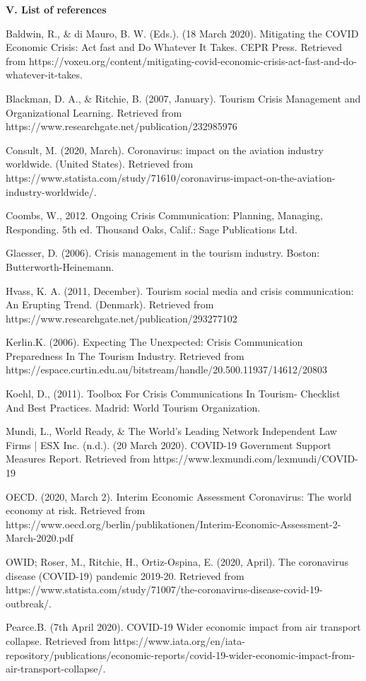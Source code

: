 \textbf{V. List of references}
\begin{flushleft}
Baldwin, R., \& di Mauro, B. W. (Eds.). (18 March 2020). Mitigating the COVID Economic Crisis: Act fast and Do Whatever It Takes. CEPR Press. Retrieved from https://voxeu.org/content/mitigating-covid-economic-crisis-act-fast-and-do-whatever-it-takes.

Blackman, D. A., \& Ritchie, B. (2007, January). Tourism Crisis Management and Organizational Learning. Retrieved from https://www.researchgate.net/publication/232985976

Consult, M. (2020, March). Coronavirus: impact on the aviation industry worldwide. (United States). Retrieved from https://www.statista.com/study/71610/coronavirus-impact-on-the-aviation-industry-worldwide/.

Coombs, W., 2012. Ongoing Crisis Communication: Planning, Managing, Responding. 5th ed. Thousand Oaks, Calif.: Sage Publications Ltd.

Glaesser, D. (2006). Crisis management in the tourism industry. Boston: Butterworth-Heinemann.

Hvass, K. A. (2011, December). Tourism social media and crisis communication: An Erupting Trend. (Denmark). Retrieved from https://www.researchgate.net/publication/293277102

Kerlin.K. (2006). Expecting The Unexpected: Crisis Communication Preparedness In The Tourism Industry. Retrieved from https://espace.curtin.edu.au/bitstream/handle/20.500.11937/14612/20803

Koehl, D., (2011). Toolbox For Crisis Communications In Tourism- Checklist And Best Practices. Madrid: World Tourism Organization.

Mundi, L., World Ready, \& The World's Leading Network Independent Law Firms | ESX Inc. (n.d.). (20 March 2020). COVID-19 Government Support Measures Report. Retrieved from https://www.lexmundi.com/lexmundi/COVID-19

OECD. (2020, March 2). Interim Economic Assessment Coronavirus: The world economy at risk. Retrieved from https://www.oecd.org/berlin/publikationen/Interim-Economic-Assessment-2-March-2020.pdf

OWID; Roser, M., Ritchie, H., Ortiz-Ospina, E. (2020, April). The coronavirus disease (COVID-19) pandemic 2019-20. Retrieved from https://www.statista.com/study/71007/the-coronavirus-disease-covid-19-outbreak/.

Pearce.B. (7th April 2020). COVID-19 Wider economic impact from air transport collapse. Retrieved from https://www.iata.org/en/iata-repository/publications/economic-reports/covid-19-wider-economic-impact-from-air-transport-collapse/.


\end{flushleft}
